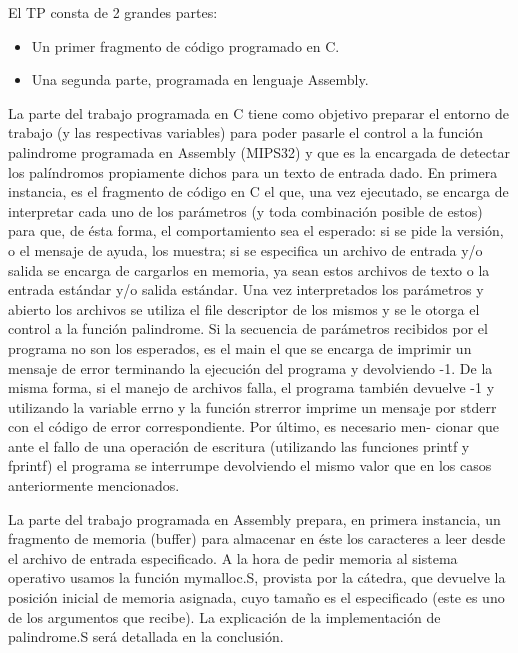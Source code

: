 \documentclass[a4paper,10pt]{article}
\begin{document}
{ \setlength{\parindent}{12pt}

El TP consta de 2 grandes partes:
\begin{itemize}
\item Un primer fragmento de código programado en C.
\item Una segunda parte, programada en lenguaje Assembly.
\end{itemize}

La parte del trabajo programada en C tiene como objetivo preparar el entorno de trabajo (y las respectivas variables) para poder pasarle el control a la función palindrome programada en Assembly (MIPS32) y que es la encargada de detectar los palíndromos propiamente dichos para un texto de entrada dado. En primera instancia, es el fragmento de código en C el que, una vez ejecutado, se encarga de interpretar cada uno de los parámetros (y toda combinación posible de estos) para que, de ésta forma, el comportamiento sea el esperado: si se pide la versión, o el mensaje de ayuda, los muestra; si se especifica un archivo de entrada y/o salida se encarga de cargarlos en memoria, ya sean estos archivos de texto o la entrada estándar y/o salida estándar. Una vez interpretados los parámetros y abierto los archivos se utiliza el file descriptor
de los mismos y se le otorga el control a la función palindrome. Si la secuencia de parámetros recibidos
por el programa no son los esperados, es el main el que se encarga de imprimir
un mensaje de error terminando la ejecución del programa y devolviendo -1. De la misma forma, si el manejo de archivos falla, el programa también devuelve -1 y utilizando la variable errno y la función strerror imprime un mensaje por stderr con el código de error correspondiente. Por último, es necesario men-
cionar que ante el fallo de una operación de escritura (utilizando las funciones printf y fprintf) el programa se interrumpe devolviendo el mismo valor que en los casos anteriormente mencionados. 

\indent 
La parte del trabajo programada en Assembly prepara, en primera instancia, un fragmento de memoria (buffer) para almacenar en éste los caracteres a leer desde el archivo de entrada especificado. A la hora de pedir memoria al sistema operativo usamos la función mymalloc.S, provista por la cátedra, que devuelve la posición inicial de memoria asignada, cuyo tamaño es el especificado (este es uno de los argumentos que recibe). La explicación de la implementación de palindrome.S será detallada en la conclusión.
	
}
\end{document}
